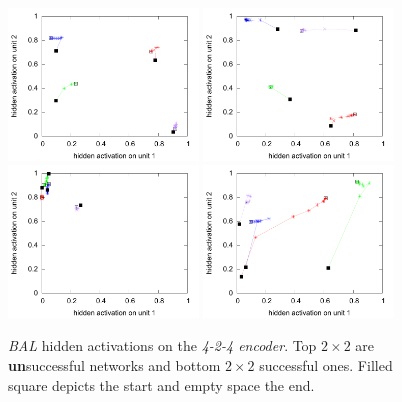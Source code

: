 \begin{figure}[H]
  \includegraphics[width=0.45\textwidth]{img/hid-bal-good-init.pdf}  
  \includegraphics[width=0.45\textwidth]{img/hid-bal-good-convex.pdf}  \\
  \includegraphics[width=0.45\textwidth]{img/hid-bal-good-step.pdf}  
  \includegraphics[width=0.45\textwidth]{img/hid-bal-good-stagnation.pdf}  \\ 
  \caption{\emph{BAL} hidden activations on the \emph{4-2-4 encoder}. Top $2\times2$ are {\bf un}successful networks and bottom $2\times2$ successful ones. Filled square depicts the start and empty space the end.}
  \label{fig:results-hidden-activations-bal}
\end{figure}


